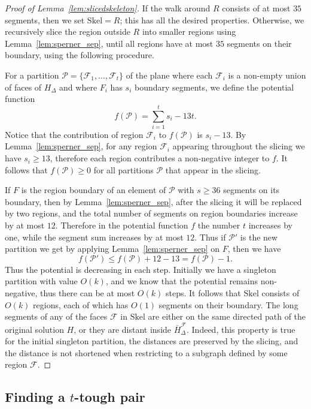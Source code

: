 \documentclass[a4paper,11pt]{article}
\newcommand{\calF}{\mathcal{F}}
\newcommand{\calP}{\mathcal{P}}
\newcommand{\Skel}{\mathrm{Skel}}
\theoremstyle{plain}
\newtheorem{identification rule}{Identification Rule}
\theoremstyle{definition}
\theoremstyle{remark}
\begin{document}
\begin{proof}[Proof of Lemma~\ref{lem:slicedskeleton}]
If the walk around $R$ consists of at most $35$ segments, then we set $\Skel=R$; this has all the desired properties. Otherwise, we recursively slice the region outside $R$ into smaller regions using Lemma~\ref{lem:sperner_sep}, until all regions have at most $35$ segments on their boundary, using the following procedure. 

For a partition $\calP=\{\calF_1,\dots,\calF_t\}$ of the plane where each $\calF_i$ is a non-empty union of faces of $H_\Delta$ and where $F_i$ has $s_i$ boundary segments, we define the potential function \[f(\calP)=\sum_{i=1}^t s_i -13t.\]
Notice that the contribution of region $\calF_i$ to $f(\calP)$ is $s_i-13$. By Lemma~\ref{lem:sperner_sep}, for any region $\calF_i$ appearing throughout the slicing we have $s_i\geq 13$, therefore each region contributes a non-negative integer to $f$. It follows that $f(\calP)\geq 0$ for all partitions $\calP$ that appear in the slicing.

If $F$ is the region boundary of an element of $\calP$ with $s\geq 36$ segments on its boundary, then by Lemma~\ref{lem:sperner_sep}, after the slicing it will be replaced by two regions, and the total number of segments on region boundaries increase by at most $12$. Therefore in the potential function $f$ the number $t$ increases by one, while the segment sum increases by at most $12$. Thus if $\calP'$ is the new partition we get by applying Lemma~\ref{lem:sperner_sep} on $F$, then we have
\[f(\calP')\leq f(\calP)+12-13 = f(\calP)-1.\]
Thus the potential is decreasing in each step. Initially we have a singleton partition with value $O(k)$, and we know that the potential remains non-negative, thus there can be at most $O(k)$ steps. It follows that $\Skel$ consists of $O(k)$ regions, each of which has $O(1)$ segments on their boundary. The long segments of any of the faces $\calF$ in $\Skel$ are either on the same directed path of the original solution $H$, or they are distant inside $\bar{H}^\calF_\Delta$. Indeed, this property is true for the initial singleton partition, the distances are preserved by the slicing, and the distance is not shortened when restricting to a subgraph defined by some region $\calF$.
\end{proof}
\subsection{Finding a $t$-tough pair}\label{sec:gridfind}
\end{document}
